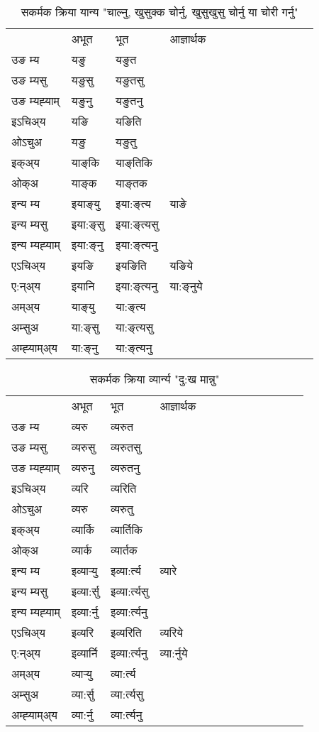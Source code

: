 \begin{table}[H]
\label{aŋ.vt} \centering
\caption{सकर्मक क्रिया  यान्य  "चाल्नु, खुसुक्क चोर्नु, खुसुखुसु चोर्नु या चोरी गर्नु"  }
\begin{tabular}{l|l|l|l|l|l|l|l|l|l|l|l|l}  \toprule
&अभूत & भूत & आज्ञार्थक \\ 
उङ म्य &यङु &यङुत \\ 
उङ म्यसु &यङुसु &यङुतसु \\ 
उङ म्यह्‍याम् &यङुनु &यङुतनु \\ 
इऽचिअ्य  &यङि &यङिति   \\ 
ओऽचुअ &यङु &यङुतु   \\ 
इक्अ्य &याङ्‌कि &याङ्‌तिकि   \\ 
ओक्अ &याङ्‌क &याङ्‌तक   \\ 
इन्य म्य& इयाङ्‌यु  & इया:ङ्‌त्य &याङे  \\ 
इन्य म्यसु & इया:ङ्‌सु  & इया:ङ्‌त्यसु   \\ 
इन्य म्यह्‍याम् & इया:ङ्‌नु  & इया:ङ्‌त्यनु   \\ 
एऽचिअ्य & इयङि & इयङिति &यङिये    \\ 
ए:न्अ्य & इयानि  & इया:ङ्‌त्यनु &या:ङ्‌नुये  \\ 
अम्अ्य & याङ्‌यु  & या:ङ्‌त्य  \\ 
अम्सुअ & या:ङ्‌सु & या:ङ्‌त्यसु  \\ 
अम्ह्‍याम्अ्य & या:ङ्‌नु  & या:ङ्‌त्यनु \\ 
\bottomrule
\end{tabular}
\end{table}


\begin{table}[H]
\label{ɛr.vt} \centering
\caption{सकर्मक क्रिया  व्यार्न्य  "दु:ख मान्नु"  }
\begin{tabular}{l|l|l|l|l|l|l|l|l|l|l|l|l}  \toprule
&अभूत & भूत & आज्ञार्थक \\ 
उङ म्य &व्यरु &व्यरुत \\ 
उङ म्यसु &व्यरुसु &व्यरुतसु \\ 
उङ म्यह्‍याम् &व्यरुनु &व्यरुतनु \\ 
इऽचिअ्य  &व्यरि &व्यरिति   \\ 
ओऽचुअ &व्यरु &व्यरुतु   \\ 
इक्अ्य &व्यार्कि &व्यार्तिकि   \\ 
ओक्अ &व्यार्क &व्यार्तक   \\ 
इन्य म्य& इव्यार्‍यु  & इव्या:र्त्य &व्यारे  \\ 
इन्य म्यसु & इव्या:र्सु  & इव्या:र्त्यसु   \\ 
इन्य म्यह्‍याम् & इव्या:र्नु  & इव्या:र्त्यनु   \\ 
एऽचिअ्य & इव्यरि & इव्यरिति &व्यरिये    \\ 
ए:न्अ्य & इव्यार्नि  & इव्या:र्त्यनु &व्या:र्नुये  \\ 
अम्अ्य & व्यार्‍यु  & व्या:र्त्य  \\ 
अम्सुअ & व्या:र्सु & व्या:र्त्यसु  \\ 
अम्ह्‍याम्अ्य & व्या:र्नु  & व्या:र्त्यनु \\ 
\bottomrule
\end{tabular}
\end{table}


